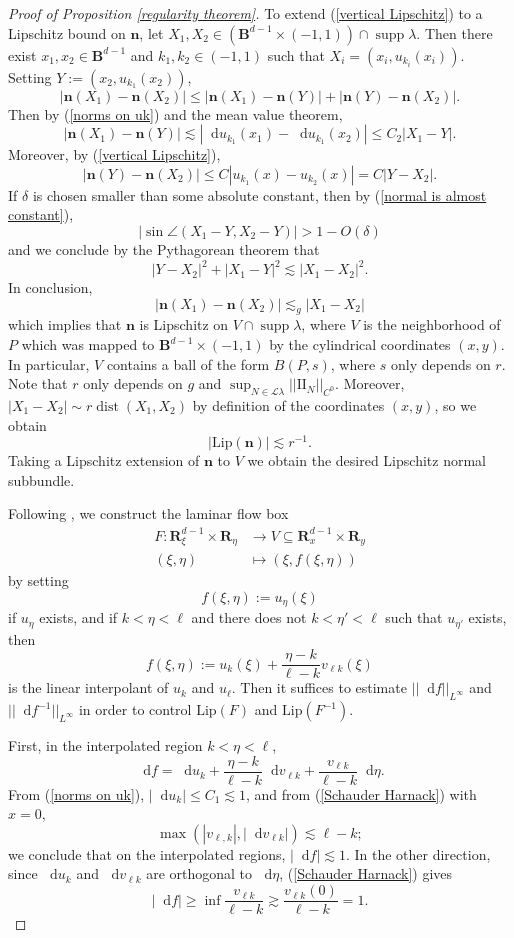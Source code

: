 \documentclass[reqno,11pt]{amsart}
\newcommand{\RR}{\mathbf{R}}
\newcommand{\Ball}{\mathbf{B}}
\newcommand*\dif{\mathop{}\!\mathrm{d}}
\DeclareMathOperator{\dist}{dist}
\DeclareMathOperator{\supp}{supp}
\newcommand{\Leaves}{\mathscr L}
\newcommand{\Two}{\mathrm{I\!I}}
\newcommand{\normal}{\mathbf n}
\newcommand{\Lip}{\mathrm{Lip}}
\theoremstyle{definition}
\numberwithin{equation}{section}
\begin{document}
\begin{proof}[Proof of Proposition \ref{regularity theorem}]
To extend (\ref{vertical Lipschitz}) to a Lipschitz bound on $\normal$, let $X_1, X_2 \in (\Ball^{d - 1} \times (-1, 1)) \cap \supp \lambda$.
Then there exist $x_1, x_2 \in \Ball^{d - 1}$ and $k_1, k_2 \in (-1, 1)$ such that $X_i = (x_i, u_{k_i}(x_i))$.
Setting $Y := (x_2, u_{k_1}(x_2))$,
$$|\normal(X_1) - \normal(X_2)| \leq |\normal(X_1) - \normal(Y)| + |\normal(Y) - \normal(X_2)|.$$
Then by (\ref{norms on uk}) and the mean value theorem,
$$|\normal(X_1) - \normal(Y)| \lesssim |\dif u_{k_1}(x_1) - \dif u_{k_1}(x_2)| \leq C_2 |X_1 - Y|.$$
Moreover, by (\ref{vertical Lipschitz}),
$$|\normal(Y) - \normal(X_2)| \leq C|u_{k_1}(x) - u_{k_2}(x)| = C|Y - X_2|.$$
If $\delta$ is chosen smaller than some absolute constant, then by (\ref{normal is almost constant}),
$$|\sin \angle(X_1 - Y, X_2 - Y)| > 1 - O(\delta)$$
and we conclude by the Pythagorean theorem that
$$|Y - X_2|^2 + |X_1 - Y|^2 \lesssim |X_1 - X_2|^2.$$
In conclusion,
$$|\normal(X_1) - \normal(X_2)| \lesssim_g |X_1 - X_2|$$
which implies that $\normal$ is Lipschitz on $V \cap \supp \lambda$, where $V$ is the neighborhood of $P$ which was mapped to $\Ball^{d - 1} \times (-1, 1)$ by the cylindrical coordinates $(x, y)$.
In particular, $V$ contains a ball of the form $B(P, s)$, where $s$ only depends on $r$.
Note that $r$ only depends on $g$ and $\sup_{N \in \Leaves \lambda} ||\Two_N||_{C^0}$.
Moreover, $|X_1 - X_2| \sim r \dist(X_1, X_2)$ by definition of the coordinates $(x, y)$, so we obtain 
\begin{equation}\label{lipschitz normal}
	|\Lip(\normal)| \lesssim r^{-1}.
\end{equation}
Taking a Lipschitz extension of $\normal$ to $V$ we obtain the desired Lipschitz normal subbundle.

Following \cite[Appendix B]{ColdingMinicozziIV}, we construct the laminar flow box
\begin{align*}
	F: \RR^{d - 1}_\xi \times \RR_\eta &\to V \subseteq \RR^{d - 1}_x \times \RR_y \\
	(\xi, \eta) &\mapsto (\xi, f(\xi, \eta))
\end{align*}
by setting
$$f(\xi, \eta) := u_\eta(\xi)$$
if $u_\eta$ exists, and if $k < \eta < \ell$ and there does not $k < \eta' < \ell$ such that $u_{\eta'}$ exists, then 
$$f(\xi, \eta) := u_k(\xi) + \frac{\eta - k}{\ell - k} v_{\ell k}(\xi)$$
is the linear interpolant of $u_k$ and $u_\ell$.
Then it suffices to estimate $||\dif f||_{L^\infty}$ and $||\dif f^{-1}||_{L^\infty}$ in order to control $\Lip(F)$ and $\Lip(F^{-1})$.

First, in the interpolated region $k < \eta < \ell$,
$$\dif f = \dif u_k + \frac{\eta - k}{\ell - k} \dif v_{\ell k} + \frac{v_{\ell k}}{\ell - k} \dif \eta.$$
From (\ref{norms on uk}), $|\dif u_k| \leq C_1 \lesssim 1$, and from (\ref{Schauder Harnack}) with $x = 0$,
$$\max(|v_{\ell, k}|, |\dif v_{\ell k}|) \lesssim \ell - k;$$
we conclude that on the interpolated regions, $|\dif f| \lesssim 1$.
In the other direction, since $\dif u_k$ and $\dif v_{\ell k}$ are orthogonal to $\dif \eta$, (\ref{Schauder Harnack}) gives
$$|\dif f| \geq \inf \frac{v_{\ell k}}{\ell - k} \gtrsim \frac{v_{\ell k}(0)}{\ell - k} = 1.$$


\end{proof}
\end{document}
